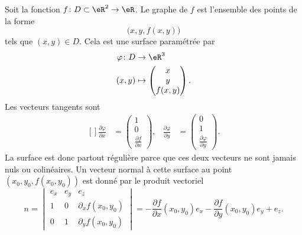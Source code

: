 Soit la fonction $f\colon D\subset\eR^2\to \eR$. Le graphe de $f$ est l'ensemble des points de la forme
\begin{equation}
    \big( x,y,f(x,y) \big)
\end{equation}
tels que $(x,y)\in D$. Cela est une surface paramétrée par
\begin{equation}
    \begin{aligned}
        \varphi\colon D&\to \eR^3 \\
        (x,y)&\mapsto \begin{pmatrix}
            x    \\ 
            y    \\ 
            f(x,y)    
        \end{pmatrix}.
    \end{aligned}
\end{equation}
Les vecteurs tangents sont
\begin{equation}
    \begin{aligned}[]
        \frac{ \partial \varphi }{ \partial x }&=\begin{pmatrix}
            1    \\ 
            0    \\ 
            \frac{ \partial f }{ \partial x }    
        \end{pmatrix},
        &\frac{ \partial \varphi }{ \partial y }&=\begin{pmatrix}
            0    \\ 
            1    \\ 
            \frac{ \partial \varphi }{ \partial y }    
        \end{pmatrix}.
    \end{aligned}
\end{equation}
La surface est donc partout régulière parce que ces deux vecteurs ne sont jamais nuls ou colinéaires. Un vecteur normal à cette surface au point $(x_0,y_0,f(x_0,y_0))$ est donné par le produit vectoriel
\begin{equation}
    n=\begin{vmatrix}
         e_x   &   e_y    &   e_z    \\
        1    &   0    &   \partial_xf(x_0,y_0)    \\
        0    & 1    &   \partial_yf(x_0,y_0)    
    \end{vmatrix}
    =-\frac{ \partial f }{ \partial x }(x_0,y_0)e_x-\frac{ \partial f }{ \partial y }(x_0,y_0)e_y+e_z.
\end{equation}

